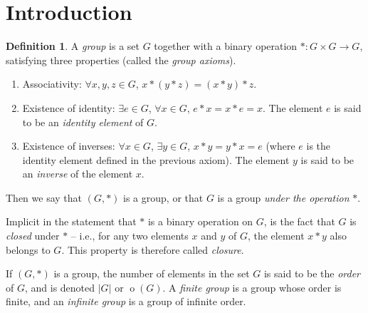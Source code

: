 \documentclass[svgnames]{article}
\theoremstyle{definition}
\newtheorem{Definition}[Theorem]{Definition}
\theoremstyle{remark}
\DeclareMathOperator{\ord}{o}
\begin{document}
\printnomenclature[10em]

\clearpage

\section{Introduction}\label{sec:Intro}
\begin{Definition}\label{def:Group}
A \emph{group} is a set $G$ together with a binary operation $* \colon G \times G \to G$, satisfying three properties (called the \emph{group axioms}).
\begin{enumerate}
\item Associativity: $\forall x, y, z \in G$, $x * (y * z) = (x * y) * z$.
\item Existence of identity: $\exists e \in G$, $\forall x \in G$, $e * x = x * e = x$. The element $e$ is said to be an \emph{identity element} of $G$.
\item Existence of inverses: $\forall x \in G$, $\exists y \in G$, $x * y = y * x = e$ (where $e$ is the identity element defined in the previous axiom). The element $y$ is said to be an \emph{inverse} of the element $x$.
\end{enumerate}
Then we say that $(G, *)$ is a group, or that $G$ is a group \emph{under the operation} $*$.
\end{Definition}
Implicit in the statement that $*$ is a binary operation on $G$, is the fact that $G$ is \emph{closed} under $*$ -- i.e., for any two elements $x$ and $y$ of $G$, the element $x * y$ also belongs to $G$. This property is therefore called \emph{closure}.

\label{def:OrdGrp} If $(G, *)$ is a group, the number of elements in the set $G$ is said to be the \emph{order} of $G$, and is denoted $|G|$ or $\ord(G)$. A \emph{finite group} is a group whose order is finite, and an \emph{infinite group} is a group of infinite order.
\end{document}
